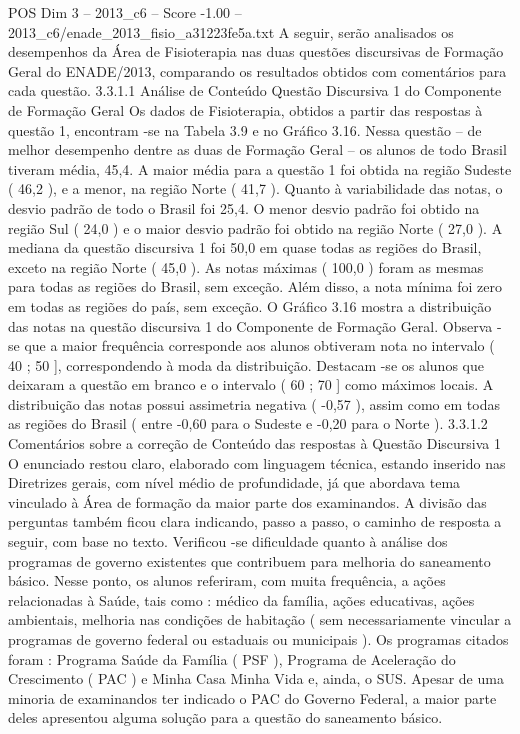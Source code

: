 \begin{textsample}{POS Dim 3 – 2013\_c6 – Score -1.00 – 2013\_c6/enade\_2013\_fisio\_a31223fe5a.txt}
A seguir, serão analisados os desempenhos da Área de Fisioterapia nas duas questões discursivas de Formação Geral do ENADE/2013, comparando os resultados obtidos com comentários para cada questão. 3.3.1.1 Análise de Conteúdo Questão Discursiva 1 do Componente de Formação Geral Os dados de Fisioterapia, obtidos a partir das respostas à questão 1, encontram -se na Tabela 3.9 e no Gráfico 3.16.
Nessa questão – de melhor desempenho dentre as duas de Formação Geral – os alunos de todo Brasil tiveram média, 45,4.
A maior média para a questão 1 foi obtida na região Sudeste ( 46,2 ), e a menor, na região Norte ( 41,7 ).
Quanto à variabilidade das notas, o desvio padrão de todo o Brasil foi 25,4.
O menor desvio padrão foi obtido na região Sul ( 24,0 ) e o maior desvio padrão foi obtido na região Norte ( 27,0 ).
A mediana da questão discursiva 1 foi 50,0 em quase todas as regiões do Brasil, exceto na região Norte ( 45,0 ).
As notas máximas ( 100,0 ) foram as mesmas para todas as regiões do Brasil, sem exceção.
Além disso, a nota mínima foi zero em todas as regiões do país, sem exceção.
O Gráfico 3.16 mostra a distribuição das notas na questão discursiva 1 do Componente de Formação Geral.
Observa -se que a maior frequência corresponde aos alunos obtiveram nota no intervalo ( 40 ; 50 ], correspondendo à moda da distribuição.
Destacam -se os alunos que deixaram a questão em branco e o intervalo ( 60 ; 70 ] como máximos locais.
A distribuição das notas possui assimetria negativa ( -0,57 ), assim como em todas as regiões do Brasil ( entre -0,60 para o Sudeste e -0,20 para o Norte ). 3.3.1.2 Comentários sobre a correção de Conteúdo das respostas à Questão Discursiva 1 O enunciado restou claro, elaborado com linguagem técnica, estando inserido nas Diretrizes gerais, com nível médio de profundidade, já que abordava tema vinculado à Área de formação da maior parte dos examinandos.
A divisão das perguntas também ficou clara indicando, passo a passo, o caminho de resposta a seguir, com base no texto.
Verificou -se dificuldade quanto à análise dos programas de governo existentes que contribuem para melhoria do saneamento básico.
Nesse ponto, os alunos referiram, com muita frequência, a ações relacionadas à Saúde, tais como : médico da família, ações educativas, ações ambientais, melhoria nas condições de habitação ( sem necessariamente vincular a programas de governo federal ou estaduais ou municipais ).
Os programas citados foram : Programa Saúde da Família ( PSF ), Programa de Aceleração do Crescimento ( PAC ) e Minha Casa Minha Vida e, ainda, o SUS.
Apesar de uma minoria de examinandos ter indicado o PAC do Governo Federal, a maior parte deles apresentou alguma solução para a questão do saneamento básico.

\end{textsample}
